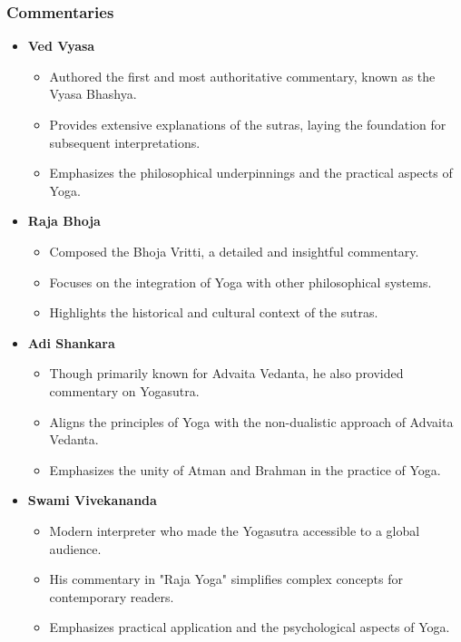 \begin{frame}[fragile]\frametitle{Commentaries}
    
    \begin{itemize}
        \item \textbf{Ved Vyasa}
        \begin{itemize}
            \item Authored the first and most authoritative commentary, known as the Vyasa Bhashya.
            \item Provides extensive explanations of the sutras, laying the foundation for subsequent interpretations.
            \item Emphasizes the philosophical underpinnings and the practical aspects of Yoga.
        \end{itemize}
        
        \item \textbf{Raja Bhoja}
        \begin{itemize}
            \item Composed the Bhoja Vritti, a detailed and insightful commentary.
            \item Focuses on the integration of Yoga with other philosophical systems.
            \item Highlights the historical and cultural context of the sutras.
        \end{itemize}
        
        \item \textbf{Adi Shankara}
        \begin{itemize}
            \item Though primarily known for Advaita Vedanta, he also provided commentary on Yogasutra.
            \item Aligns the principles of Yoga with the non-dualistic approach of Advaita Vedanta.
            \item Emphasizes the unity of Atman and Brahman in the practice of Yoga.
        \end{itemize}
        
        \item \textbf{Swami Vivekananda}
        \begin{itemize}
            \item Modern interpreter who made the Yogasutra accessible to a global audience.
            \item His commentary in "Raja Yoga" simplifies complex concepts for contemporary readers.
            \item Emphasizes practical application and the psychological aspects of Yoga.
        \end{itemize}
    \end{itemize}
    
\end{frame}



